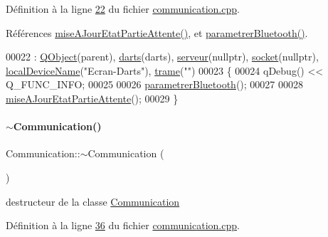 Définition à la ligne \hyperlink{communication_8cpp_source_l00022}{22} du fichier \hyperlink{communication_8cpp_source}{communication.\+cpp}.



Références \hyperlink{communication_8cpp_source_l00382}{mise\+A\+Jour\+Etat\+Partie\+Attente()}, et \hyperlink{communication_8cpp_source_l00059}{parametrer\+Bluetooth()}.


\begin{DoxyCode}
00022                                                           : \hyperlink{class_q_object}{QObject}(parent), 
      \hyperlink{class_communication_a494d609c206472041468e362d7cfc0e5}{darts}(darts), \hyperlink{class_communication_a6384747297d6efa9e8fd2fc79ed0c269}{serveur}(\textcolor{keyword}{nullptr}), \hyperlink{class_communication_aa4ddc3151b305db0135d5826384645cc}{socket}(\textcolor{keyword}{nullptr}), 
      \hyperlink{class_communication_aa70c6b4acb921b03ffa8b8b044e87a94}{localDeviceName}(\textcolor{stringliteral}{"Ecran-Darts"}), \hyperlink{class_communication_ac8f5004bfaaf7f538ba5ae93255f772b}{trame}(\textcolor{stringliteral}{""})
00023 \{
00024     qDebug() << Q\_FUNC\_INFO;
00025 
00026     \hyperlink{class_communication_abe2349c8e1d9536a73c8741425ba867f}{parametrerBluetooth}();
00027 
00028     \hyperlink{class_communication_a72557be8ab858096e03f08e78e036aeb}{miseAJourEtatPartieAttente}();
00029 \}
\end{DoxyCode}
\mbox{\label{class_communication_a75ba08ce908d45251e28e4c1db94e6f4}} 
\paragraph{\texorpdfstring{$\sim$\+Communication()}{~Communication()}}
{\footnotesize\ttfamily Communication\+::$\sim$\+Communication (\begin{DoxyParamCaption}{ }\end{DoxyParamCaption})}



destructeur de la classe \hyperlink{class_communication}{Communication} 



Définition à la ligne \hyperlink{communication_8cpp_source_l00036}{36} du fichier \hyperlink{communication_8cpp_source}{communication.\+cpp}.



